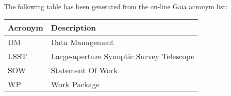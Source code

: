 The following table has been generated from the on-line Gaia acronym list:
\newline\newline%
\addtocounter{table}{-1}
\begin{longtable}{|l|p{}|}\hline 
\textbf{Acronym} & \textbf{Description}  \\\hline
DM&Data Management \\\hline
LSST&Large-aperture Synoptic Survey Telescope \\\hline
SOW&Statement Of Work \\\hline
WP&Work Package \\\hline
\end{longtable} 
